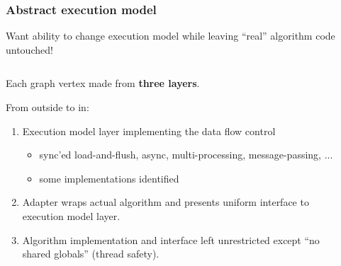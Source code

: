 \documentclass[xcolor=dvipsnames]{beamer}
\begin{document}
\begin{frame}
  \frametitle{Abstract execution model}

  \scriptsize Want ability to change execution model while leaving ``real'' algorithm code untouched!

\footnotesize
  
  \begin{columns}
    \begin{column}{0.65\textwidth}
      Each graph vertex made from \textbf{three layers}.\\

      \vspace{2mm}

      From outside to in:
      \begin{enumerate}
      \item Execution model layer implementing the data flow control
        \begin{itemize}\scriptsize
        \item sync'ed load-and-flush, async, multi-processing, message-passing, ...
        \item some implementations identified
        \end{itemize}
      \item Adapter wraps actual algorithm and presents uniform
        interface to execution model layer.
      \item Algorithm implementation and interface left unrestricted
        except ``no shared globals'' (thread safety).
      \end{enumerate}
    \end{column}
    \begin{column}{0.35\textwidth}

\end{column}
\end{columns}
\end{frame}
\end{document}
